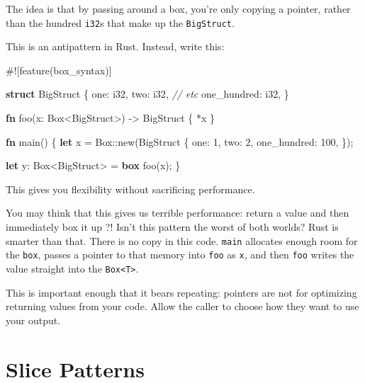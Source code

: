 \documentclass[a4paper,]{book}
\newenvironment{Shaded}{\begin{snugshade}}{\end{snugshade}}
\newcommand{\KeywordTok}[1]{\textcolor[rgb]{0.13,0.29,0.53}{\textbf{{#1}}}}
\newcommand{\DataTypeTok}[1]{\textcolor[rgb]{0.13,0.29,0.53}{{#1}}}
\newcommand{\DecValTok}[1]{\textcolor[rgb]{0.00,0.00,0.81}{{#1}}}
\newcommand{\CommentTok}[1]{\textcolor[rgb]{0.56,0.35,0.01}{\textit{{#1}}}}
\newcommand{\AttributeTok}[1]{\textcolor[rgb]{0.77,0.63,0.00}{{#1}}}
\newcommand{\NormalTok}[1]{{#1}}
\begin{document}
The idea is that by passing around a box, you're only copying a pointer,
rather than the hundred \texttt{i32}s that make up the
\texttt{BigStruct}.

This is an antipattern in Rust. Instead, write this:

\begin{Shaded}
\begin{Highlighting}[]
\AttributeTok{#![}\NormalTok{feature}\AttributeTok{(}\NormalTok{box_syntax}\AttributeTok{)]}

\KeywordTok{struct} \NormalTok{BigStruct \{}
    \NormalTok{one: }\DataTypeTok{i32}\NormalTok{,}
    \NormalTok{two: }\DataTypeTok{i32}\NormalTok{,}
    \CommentTok{// etc}
    \NormalTok{one_hundred: }\DataTypeTok{i32}\NormalTok{,}
\NormalTok{\}}

\KeywordTok{fn} \NormalTok{foo(x: }\DataTypeTok{Box}\NormalTok{<BigStruct>) -> BigStruct \{}
    \NormalTok{*x}
\NormalTok{\}}

\KeywordTok{fn} \NormalTok{main() \{}
    \KeywordTok{let} \NormalTok{x = }\DataTypeTok{Box}\NormalTok{::new(BigStruct \{}
        \NormalTok{one: }\DecValTok{1}\NormalTok{,}
        \NormalTok{two: }\DecValTok{2}\NormalTok{,}
        \NormalTok{one_hundred: }\DecValTok{100}\NormalTok{,}
    \NormalTok{\});}

    \KeywordTok{let} \NormalTok{y: }\DataTypeTok{Box}\NormalTok{<BigStruct> = }\KeywordTok{box} \NormalTok{foo(x);}
\NormalTok{\}}
\end{Highlighting}
\end{Shaded}

This gives you flexibility without sacrificing performance.

You may think that this gives us terrible performance: return a value
and then immediately box it up ?! Isn't this pattern the worst of both
worlds? Rust is smarter than that. There is no copy in this code.
\texttt{main} allocates enough room for the \texttt{box}, passes a
pointer to that memory into \texttt{foo} as \texttt{x}, and then
\texttt{foo} writes the value straight into the
\texttt{Box\textless{}T\textgreater{}}.

This is important enough that it bears repeating: pointers are not for
optimizing returning values from your code. Allow the caller to choose
how they want to use your output.

\section{Slice Patterns}\label{sec--slice-patterns}
\end{document}
